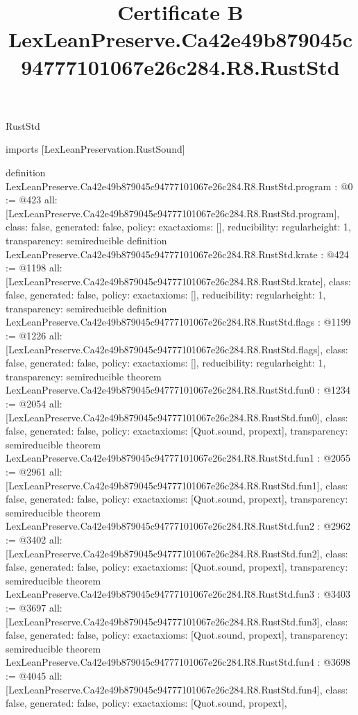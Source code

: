 \begin{lexlean}{RustStd}
\title{Certificate B LexLeanPreserve.Ca42e49b879045c94777101067e26c284.R8.RustStd}
\begin{coremodule}
imports [LexLeanPreservation.RustSound]

definition LexLeanPreserve.Ca42e49b879045c94777101067e26c284.R8.RustStd.program : @0 := @423 {
  all: [LexLeanPreserve.Ca42e49b879045c94777101067e26c284.R8.RustStd.program],
  class: false,
  generated: false,
  policy: exact{axioms: []},
  reducibility: regular{height: 1},
  transparency: semireducible
}
definition LexLeanPreserve.Ca42e49b879045c94777101067e26c284.R8.RustStd.krate : @424 := @1198 {
  all: [LexLeanPreserve.Ca42e49b879045c94777101067e26c284.R8.RustStd.krate],
  class: false,
  generated: false,
  policy: exact{axioms: []},
  reducibility: regular{height: 1},
  transparency: semireducible
}
definition LexLeanPreserve.Ca42e49b879045c94777101067e26c284.R8.RustStd.flags : @1199 := @1226 {
  all: [LexLeanPreserve.Ca42e49b879045c94777101067e26c284.R8.RustStd.flags],
  class: false,
  generated: false,
  policy: exact{axioms: []},
  reducibility: regular{height: 1},
  transparency: semireducible
}
theorem LexLeanPreserve.Ca42e49b879045c94777101067e26c284.R8.RustStd.fun0 : @1234 := @2054 {
  all: [LexLeanPreserve.Ca42e49b879045c94777101067e26c284.R8.RustStd.fun0],
  class: false,
  generated: false,
  policy: exact{axioms: [Quot.sound, propext]},
  transparency: semireducible
}
theorem LexLeanPreserve.Ca42e49b879045c94777101067e26c284.R8.RustStd.fun1 : @2055 := @2961 {
  all: [LexLeanPreserve.Ca42e49b879045c94777101067e26c284.R8.RustStd.fun1],
  class: false,
  generated: false,
  policy: exact{axioms: [Quot.sound, propext]},
  transparency: semireducible
}
theorem LexLeanPreserve.Ca42e49b879045c94777101067e26c284.R8.RustStd.fun2 : @2962 := @3402 {
  all: [LexLeanPreserve.Ca42e49b879045c94777101067e26c284.R8.RustStd.fun2],
  class: false,
  generated: false,
  policy: exact{axioms: [Quot.sound, propext]},
  transparency: semireducible
}
theorem LexLeanPreserve.Ca42e49b879045c94777101067e26c284.R8.RustStd.fun3 : @3403 := @3697 {
  all: [LexLeanPreserve.Ca42e49b879045c94777101067e26c284.R8.RustStd.fun3],
  class: false,
  generated: false,
  policy: exact{axioms: [Quot.sound, propext]},
  transparency: semireducible
}
theorem LexLeanPreserve.Ca42e49b879045c94777101067e26c284.R8.RustStd.fun4 : @3698 := @4045 {
  all: [LexLeanPreserve.Ca42e49b879045c94777101067e26c284.R8.RustStd.fun4],
  class: false,
  generated: false,
  policy: exact{axioms: [Quot.sound, propext]},
}
\end{coremodule}
\end{lexlean}
